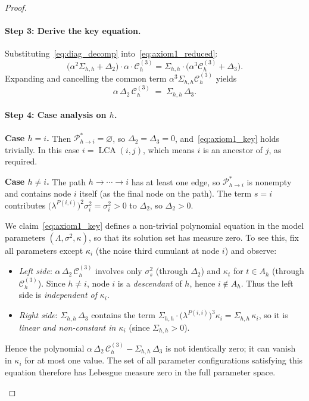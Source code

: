 \documentclass[11pt,a4paper]{article}
\numberwithin{equation}{section}
\begin{document}
\begin{proof}
\begin{enumerate}[label=(\arabic*)]
\paragraph{Step 3: Derive the key equation.}
Substituting~\eqref{eq:diag_decomp} into~\eqref{eq:axiom1_reduced}:
\[
  \bigl(\alpha^{2}\Sigma_{h,h}+\Delta_{2}\bigr)\cdot\alpha
  \cdot\mathcal{C}^{(3)}_{h}
  = \Sigma_{h,h}\cdot
  \bigl(\alpha^{3}\mathcal{C}^{(3)}_{h}+\Delta_{3}\bigr).
\]
Expanding and cancelling the common term
$\alpha^{3}\Sigma_{h,h}\mathcal{C}^{(3)}_{h}$ yields
\begin{equation}\label{eq:axiom1_key}
  \alpha\,\Delta_{2}\,\mathcal{C}^{(3)}_{h}
  \;=\;
  \Sigma_{h,h}\,\Delta_{3}.
\end{equation}

\paragraph{Step 4: Case analysis on $h$.}

\textbf{Case $h = i$.}
Then $\mathcal{P}^{*}_{h\to i} = \varnothing$, so
$\Delta_{2} = \Delta_{3} = 0$, and~\eqref{eq:axiom1_key} holds
trivially.  In this case $i = \operatorname{LCA}(i,j)$, which means $i$
is an ancestor of $j$, as required.

\textbf{Case $h \ne i$.}
The path $h \to \cdots \to i$ has at least one edge, so
$\mathcal{P}^{*}_{h\to i}$ is nonempty and contains node $i$ itself
(as the final node on the path).  The term $s = i$ contributes
$\bigl(\lambda^{P(i,i)}\bigr)^{2}\sigma_i^{2} = \sigma_i^{2} > 0$
to $\Delta_2$, so $\Delta_2 > 0$.

We claim~\eqref{eq:axiom1_key} defines a non-trivial polynomial
equation in the model parameters $(\Lambda,\sigma^{2},\kappa)$, so
that its solution set has measure zero.  To see this, fix all
parameters except $\kappa_i$ (the noise third cumulant at node $i$)
and observe:
\begin{itemize}
  \item \emph{Left side}: $\alpha\,\Delta_{2}\,\mathcal{C}^{(3)}_{h}$
    involves only $\sigma_s^{2}$ (through $\Delta_2$) and $\kappa_t$
    for $t \in A_h$ (through $\mathcal{C}^{(3)}_h$).  Since
    $h \ne i$, node $i$ is a \emph{descendant} of $h$, hence
    $i \notin A_h$.  Thus the left side is \emph{independent of}
    $\kappa_i$.
  \item \emph{Right side}: $\Sigma_{h,h}\,\Delta_{3}$ contains the
    term $\Sigma_{h,h}\cdot\bigl(\lambda^{P(i,i)}\bigr)^{3}\kappa_i
    = \Sigma_{h,h}\,\kappa_i$, so it is \emph{linear and
    non-constant in $\kappa_i$} (since $\Sigma_{h,h} > 0$).
\end{itemize}
Hence the polynomial
$\alpha\,\Delta_{2}\,\mathcal{C}^{(3)}_{h} - \Sigma_{h,h}\,\Delta_{3}$
is not identically zero; it can vanish in $\kappa_i$ for at most one
value.  The set of all parameter configurations satisfying this
equation therefore has Lebesgue measure zero in the full parameter space.


\end{enumerate}
\end{proof}
\end{document}
